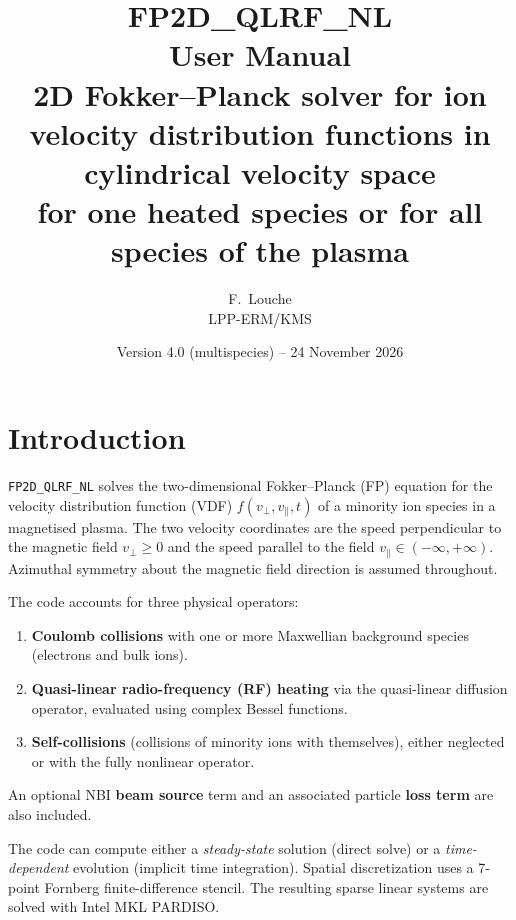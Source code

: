 \documentclass[11pt,a4paper]{article}
\title{\textbf{FP2D\_QLRF\_NL}\\[0.4em]
       \large User Manual\\[0.4em]
       \normalsize 2D Fokker--Planck solver for ion velocity distribution
       functions in cylindrical velocity space\\
       for one heated species or for all species of the plasma}
\author{F.~Louche\\LPP-ERM/KMS}
\date{Version 4.0 (multispecies) -- 24 November 2026}
\newcommand{\vp}{v_\perp}
\newcommand{\vpa}{v_\parallel}
\begin{document}
\maketitle
\tableofcontents
\newpage

\section{Introduction}

\texttt{FP2D\_QLRF\_NL} solves the two-dimensional Fokker--Planck (FP) equation
for the velocity distribution function (VDF) $f(\vp,\vpa,t)$ of a minority ion
species in a magnetised plasma.  The two velocity coordinates are the speed
perpendicular to the magnetic field $\vp \ge 0$ and the speed parallel to the
field $\vpa \in (-\infty,+\infty)$.  Azimuthal symmetry about the magnetic
field direction is assumed throughout.

The code accounts for three physical operators:
\begin{enumerate}
  \item \textbf{Coulomb collisions} with one or more Maxwellian background
        species (electrons and bulk ions).
  \item \textbf{Quasi-linear radio-frequency (RF) heating} via the
        quasi-linear diffusion operator, evaluated using complex Bessel
        functions.
  \item \textbf{Self-collisions} (collisions of minority ions with
        themselves), either neglected or with the fully nonlinear operator.
\end{enumerate}
An optional NBI \textbf{beam source} term and an associated particle
\textbf{loss term} are also included.

The code can compute either a \emph{steady-state} solution (direct solve) or
a \emph{time-dependent} evolution (implicit time integration).  Spatial
discretization uses a 7-point Fornberg finite-difference stencil.  The
resulting sparse linear systems are solved with Intel MKL PARDISO.
\end{document}
